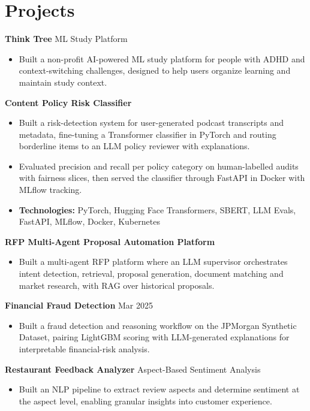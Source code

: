 \documentclass[10pt,a4paper]{article}
\begin{document}
\section{Projects}
\textbf{Think Tree} \textbar{} ML Study Platform\par
\begin{itemize}
  \item Built a non-profit AI-powered ML study platform for people with ADHD and context-switching challenges, designed to help users organize learning and maintain study context.
\end{itemize}
\textbf{Content Policy Risk Classifier}\par
\begin{itemize}
  \item Built a risk-detection system for user-generated podcast transcripts and metadata, fine-tuning a Transformer classifier in PyTorch and routing borderline items to an LLM policy reviewer with explanations.
  \item Evaluated precision and recall per policy category on human-labelled audits with fairness slices, then served the classifier through FastAPI in Docker with MLflow tracking.
  \item \textbf{Technologies:} PyTorch, Hugging Face Transformers, SBERT, LLM Evals, FastAPI, MLflow, Docker, Kubernetes
\end{itemize}
\textbf{RFP Multi-Agent Proposal Automation Platform}\par
\begin{itemize}
  \item Built a multi-agent RFP platform where an LLM supervisor orchestrates intent detection, retrieval, proposal generation, document matching and market research, with RAG over historical proposals.
\end{itemize}
\textbf{Financial Fraud Detection} \textbar{} Mar 2025\par
\begin{itemize}
  \item Built a fraud detection and reasoning workflow on the JPMorgan Synthetic Dataset, pairing LightGBM scoring with LLM-generated explanations for interpretable financial-risk analysis.
\end{itemize}
\textbf{Restaurant Feedback Analyzer} \textbar{} Aspect-Based Sentiment Analysis\par
\begin{itemize}
  \item Built an NLP pipeline to extract review aspects and determine sentiment at the aspect level, enabling granular insights into customer experience.
\end{itemize}
\end{document}
